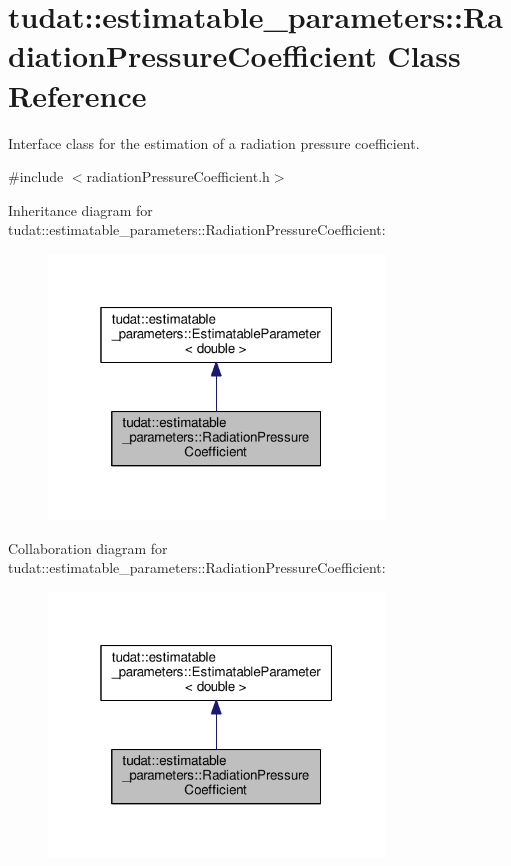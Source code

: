 \hypertarget{classtudat_1_1estimatable__parameters_1_1RadiationPressureCoefficient}{}\section{tudat\+:\+:estimatable\+\_\+parameters\+:\+:Radiation\+Pressure\+Coefficient Class Reference}
\label{classtudat_1_1estimatable__parameters_1_1RadiationPressureCoefficient}


Interface class for the estimation of a radiation pressure coefficient.  




{\ttfamily \#include $<$radiation\+Pressure\+Coefficient.\+h$>$}



Inheritance diagram for tudat\+:\+:estimatable\+\_\+parameters\+:\+:Radiation\+Pressure\+Coefficient\+:
\nopagebreak
\begin{figure}[H]
\begin{center}
\leavevmode
\includegraphics[width=253pt]{classtudat_1_1estimatable__parameters_1_1RadiationPressureCoefficient__inherit__graph}
\end{center}
\end{figure}


Collaboration diagram for tudat\+:\+:estimatable\+\_\+parameters\+:\+:Radiation\+Pressure\+Coefficient\+:
\nopagebreak
\begin{figure}[H]
\begin{center}
\leavevmode
\includegraphics[width=253pt]{classtudat_1_1estimatable__parameters_1_1RadiationPressureCoefficient__coll__graph}
\end{center}
\end{figure}

